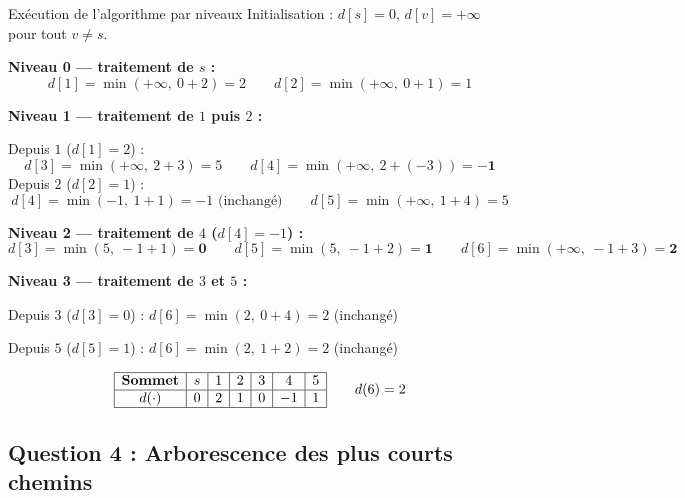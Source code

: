 \documentclass[12pt,a4paper]{article}
\begin{document}
\begin{etape}{Exécution de l'algorithme par niveaux}
Initialisation : $d[s]=0$, $d[v]=+\infty$ pour tout $v \neq s$.

\medskip
\textbf{Niveau 0 --- traitement de $s$ :}
\[
d[1] = \min(+\infty,\ 0+2) = 2 \qquad d[2] = \min(+\infty,\ 0+1) = 1
\]

\textbf{Niveau 1 --- traitement de $1$ puis $2$ :}

Depuis $1$ ($d[1]=2$) :
\[
d[3] = \min(+\infty,\ 2+3) = 5 \qquad d[4] = \min(+\infty,\ 2+(-3)) = \mathbf{-1}
\]
Depuis $2$ ($d[2]=1$) :
\[
d[4] = \min(-1,\ 1+1) = -1 \text{ (inchangé)} \qquad d[5] = \min(+\infty,\ 1+4) = 5
\]

\textbf{Niveau 2 --- traitement de $4$ ($d[4]=-1$) :}
\[
d[3] = \min(5,\ -1+1) = \mathbf{0} \qquad d[5] = \min(5,\ -1+2) = \mathbf{1} \qquad d[6] = \min(+\infty,\ -1+3) = \mathbf{2}
\]

\textbf{Niveau 3 --- traitement de $3$ et $5$ :}

Depuis $3$ ($d[3]=0$) : $d[6] = \min(2,\ 0+4) = 2$ (inchangé)

Depuis $5$ ($d[5]=1$) : $d[6] = \min(2,\ 1+2) = 2$ (inchangé)
\end{etape}

\begin{resultat}
\[
\begin{array}{|c|c|c|c|c|c|c|}
\hline
\textbf{Sommet} & s & 1 & 2 & 3 & 4 & 5 \\\hline
d(\cdot) & 0 & 2 & 1 & 0 & -1 & 1 \\\hline
\end{array}
\qquad d(6) = 2
\]
\end{resultat}

\subsection{Question 4 : Arborescence des plus courts chemins}
\end{document}

